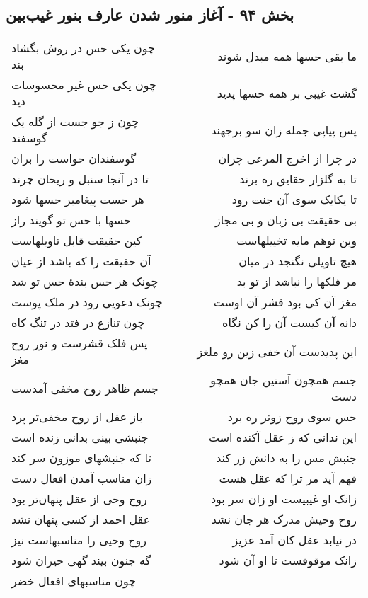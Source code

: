 \begin{center}
\section*{بخش ۹۴ - آغاز منور شدن عارف بنور غیب‌بین}
\label{sec:sh094}
\begin{longtable}{l p{0.5cm} r}
چون یکی حس در روش بگشاد بند
&&
ما بقی حسها همه مبدل شوند
\\
چون یکی حس غیر محسوسات دید
&&
گشت غیبی بر همه حسها پدید
\\
چون ز جو جست از گله یک گوسفند
&&
پس پیاپی جمله زان سو برجهند
\\
گوسفندان حواست را بران
&&
در چرا از اخرج المرعی چران
\\
تا در آنجا سنبل و ریحان چرند
&&
تا به گلزار حقایق ره برند
\\
هر حست پیغامبر حسها شود
&&
تا یکایک سوی آن جنت رود
\\
حسها با حس تو گویند راز
&&
بی حقیقت بی زبان و بی مجاز
\\
کین حقیقت قابل تاویلهاست
&&
وین توهم مایه تخییلهاست
\\
آن حقیقت را که باشد از عیان
&&
هیچ تاویلی نگنجد در میان
\\
چونک هر حس بندهٔ حس تو شد
&&
مر فلکها را نباشد از تو بد
\\
چونک دعویی رود در ملک پوست
&&
مغز آن کی بود قشر آن اوست
\\
چون تنازع در فتد در تنگ کاه
&&
دانه آن کیست آن را کن نگاه
\\
پس فلک قشرست و نور روح مغز
&&
این پدیدست آن خفی زین رو ملغز
\\
جسم ظاهر روح مخفی آمدست
&&
جسم همچون آستین جان همچو دست
\\
باز عقل از روح مخفی‌تر پرد
&&
حس سوی روح زوتر ره برد
\\
جنبشی بینی بدانی زنده است
&&
این ندانی که ز عقل آکنده است
\\
تا که جنبشهای موزون سر کند
&&
جنبش مس را به دانش زر کند
\\
زان مناسب آمدن افعال دست
&&
فهم آید مر ترا که عقل هست
\\
روح وحی از عقل پنهان‌تر بود
&&
زانک او غیبیست او زان سر بود
\\
عقل احمد از کسی پنهان نشد
&&
روح وحیش مدرک هر جان نشد
\\
روح وحیی را مناسبهاست نیز
&&
در نیابد عقل کان آمد عزیز
\\
گه جنون بیند گهی حیران شود
&&
زانک موقوفست تا او آن شود
\\
چون مناسبهای افعال خضر

\end{longtable}
\end{center}
